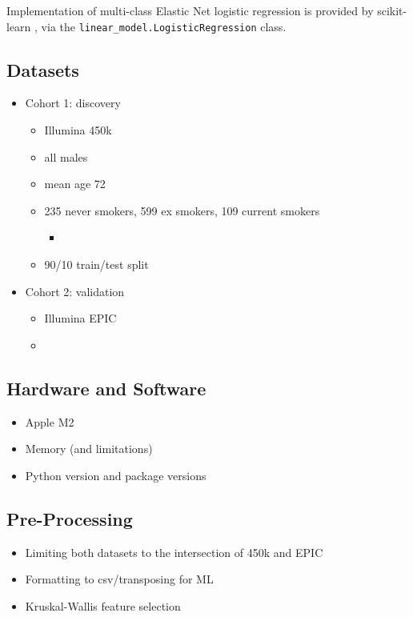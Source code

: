 \documentclass{article}
\begin{document}
Implementation of multi-class Elastic Net logistic regression is provided by scikit-learn \cite{scikit-learn}, via the \verb|linear_model.LogisticRegression| class.

\subsection{Datasets}
\begin{itemize}
    \item Cohort 1: discovery
          \begin{itemize}
              \item Illumina 450k
              \item all males
              \item mean age 72
              \item 235 never smokers, 599 ex smokers, 109 current smokers
              \begin{itemize}
                \item 
              \end{itemize}
              \item 90/10 train/test split
          \end{itemize}
    \item Cohort 2: validation
          \begin{itemize}
              \item Illumina EPIC
              \item
          \end{itemize}
\end{itemize}

\subsection{Hardware and Software}
\begin{itemize}
    \item Apple M2
    \item Memory (and limitations)
    \item Python version and package versions
\end{itemize}

\subsection{Pre-Processing}
\begin{itemize}
    \item Limiting both datasets to the intersection of 450k and EPIC
    \item Formatting to csv/transposing for ML
    \item Kruskal-Wallis feature selection
\end{itemize}
\end{document}
